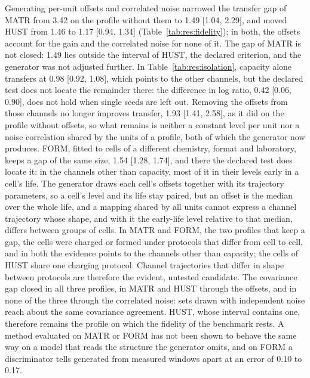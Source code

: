\documentclass{article}
\begin{document}
Generating per-unit offsets and correlated noise narrowed the transfer gap of MATR from 3.42 on the profile without them to 1.49 [1.04, 2.29], and moved HUST from 1.46 to 1.17 [0.94, 1.34] (Table~\ref{tab:res:fidelity}); in both, the offsets account for the gain and the correlated noise for none of it. The gap of MATR is not closed: 1.49 lies outside the interval of HUST, the declared criterion, and the generator was not adjusted further. In Table~\ref{tab:res:isolation}, capacity alone transfers at 0.98 [0.92, 1.08], which points to the other channels, but the declared test does not locate the remainder there: the difference in log ratio, 0.42 [0.06, 0.90], does not hold when single seeds are left out. Removing the offsets from those channels no longer improves transfer, 1.93 [1.41, 2.58], as it did on the profile without offsets, so what remains is neither a constant level per unit nor a noise correlation shared by the units of a profile, both of which the generator now produces. FORM, fitted to cells of a different chemistry, format and laboratory, keeps a gap of the same size, 1.54 [1.28, 1.74], and there the declared test does locate it: in the channels other than capacity, most of it in their levels early in a cell's life. The generator draws each cell's offsets together with its trajectory parameters, so a cell's level and its life stay paired, but an offset is the median over the whole life, and a mapping shared by all units cannot express a channel trajectory whose shape, and with it the early-life level relative to that median, differs between groups of cells. In MATR and FORM, the two profiles that keep a gap, the cells were charged or formed under protocols that differ from cell to cell, and in both the evidence points to the channels other than capacity; the cells of HUST share one charging protocol. Channel trajectories that differ in shape between protocols are therefore the evident, untested candidate. The covariance gap closed in all three profiles, in MATR and HUST through the offsets, and in none of the three through the correlated noise: sets drawn with independent noise reach about the same covariance agreement. HUST, whose interval contains one, therefore remains the profile on which the fidelity of the benchmark rests. A method evaluated on MATR or FORM has not been shown to behave the same way on a model that reads the structure the generator omits, and on FORM a discriminator tells generated from measured windows apart at an error of 0.10 to 0.17.
\end{document}
